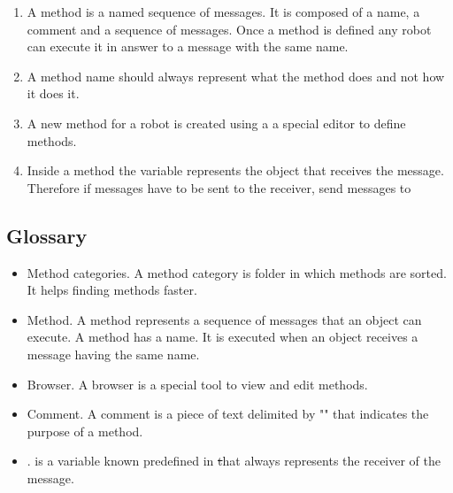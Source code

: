 \summa

\begin{enumerate}
\item A method is a named sequence of messages. It is composed of
a name, a comment and a sequence of messages. Once a method is defined any robot can execute it in answer to a message with the same name.

\item A method name should always represent what the method does 
and not how it does it. 

\item A new method for a robot is created using a \tb \ie a special 
editor to define methods. 

\item Inside a method the variable  represents the 
object that receives the message. Therefore if messages have to be sent to the receiver, send messages to \self
\end{enumerate}


\subsection*{Glossary}
\begin{itemize}
\item Method categories. A method category is folder in which methods are sorted. It helps finding methods faster. 
\item Method. A method represents a sequence of messages that an object can execute. A method has a name. It is executed when an object receives a message having the same name. 
\item Browser. A browser is a special tool to view and edit methods. 
\item Comment. A comment is a piece of text delimited by "" that indicates the purpose of a method. 
\item \self. \self is a variable known predefined in \st that always represents the receiver of the message. 
\end{itemize}


\ifx\wholebook\relax\else\fi
